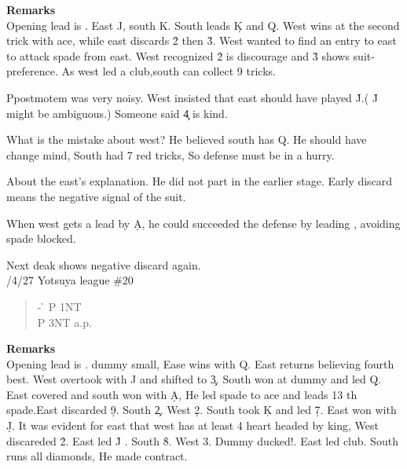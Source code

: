 {\bf Remarks}\\

Opening lead is . East \s J, south \s K. South leads \d K and \d Q.
West wins at the second trick with ace, while east discards \h 2 then \h 3.
West wanted to find an entry to east to attack spade from east.
West recognized \h 2 is discourage and \h 3 shows suit-preference.
As west led a club,south can collect 9 tricks.

Ppostmotem was very noisy. West insisted that east should have
played \h J.( \h J might be ambiguous.) Someone said \c 4 is kind.

What is the mistake about west? He believed south has \s Q.
He should have change mind, South had 7 red tricks, So defense
must be in a hurry.

About the east's explanation. He did not part  in the
earlier stage. Early discard means the negative signal of the suit.

When west gets a lead by \d A, he could succeeded the defense by leading 
, avoiding spade blocked.
\vspace{0.5cm}

Next deak shows negative discard again.\\
/4/27 Yotsuya league \#20
\begin{quote}
%
  {}%
  {}
  {}%
  {}%
\end{quote}
\begin{quote}
\begin{bidding}
- \h   \> P  \> 1NT\\
P \> 3NT \> a.p.
\end{bidding}
\end{quote}

{\bf Remarks}\\

Opening lead is . dummy small, Ease wins with \s Q.
East returns  believing fourth best. West overtook with
\s J and shifted to \c 3. South won at dummy and led \d Q.
East covered and south won with \d A, He led spade to ace and 
leads 13 th spade.East discarded \d 9. South \c 2. West \d 2.
South took \c K and led \d 7. East won with \d J. It was 
evident for east that west has at least 4 heart headed by king,
West discareded \h 2. East led \h J . South \h 8. West 3. Dummy
ducked!. East led club. South runs all diamonds, He made contract.

